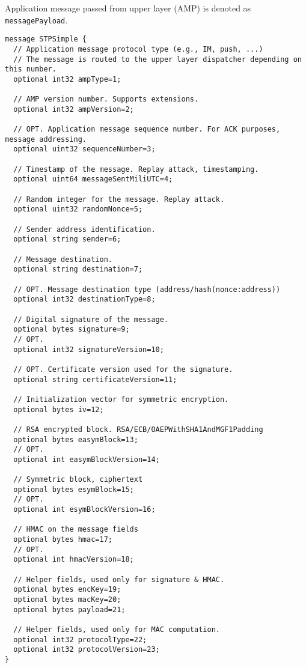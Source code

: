 \documentclass[a4paper,10pt]{article}
\begin{document}
Application message passed from upper layer (AMP) is denoted as \verb#messagePayload#. 
\begin{Verbatim}[frame=single]
message STPSimple {
  // Application message protocol type (e.g., IM, push, ...)
  // The message is routed to the upper layer dispatcher depending on this number.
  optional int32 ampType=1;
  
  // AMP version number. Supports extensions.
  optional int32 ampVersion=2;
  
  // OPT. Application message sequence number. For ACK purposes, message addressing.
  optional uint32 sequenceNumber=3;
  
  // Timestamp of the message. Replay attack, timestamping.
  optional uint64 messageSentMiliUTC=4;
  
  // Random integer for the message. Replay attack.
  optional uint32 randomNonce=5;
  
  // Sender address identification.
  optional string sender=6;
  
  // Message destination.
  optional string destination=7;
  
  // OPT. Message destination type (address/hash(nonce:address))
  optional int32 destinationType=8;
  
  // Digital signature of the message.
  optional bytes signature=9;
  // OPT.
  optional int32 signatureVersion=10;
  
  // OPT. Certificate version used for the signature.
  optional string certificateVersion=11;
  
  // Initialization vector for symmetric encryption.
  optional bytes iv=12;
  
  // RSA encrypted block. RSA/ECB/OAEPWithSHA1AndMGF1Padding
  optional bytes easymBlock=13;
  // OPT.
  optional int easymBlockVersion=14;
  
  // Symmetric block, ciphertext
  optional bytes esymBlock=15;
  // OPT.
  optional int esymBlockVersion=16;
  
  // HMAC on the message fields
  optional bytes hmac=17;
  // OPT.
  optional int hmacVersion=18;
  
  // Helper fields, used only for signature & HMAC.
  optional bytes encKey=19;
  optional bytes macKey=20;
  optional bytes payload=21;
  
  // Helper fields, used only for MAC computation. 
  optional int32 protocolType=22;
  optional int32 protocolVersion=23;
}
\end{Verbatim} 
\end{document}
